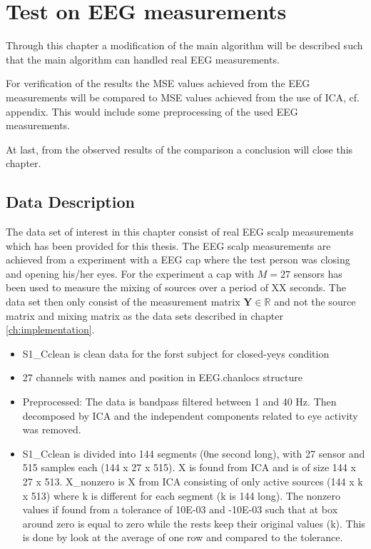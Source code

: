 \chapter{Test on EEG measurements}\label{ch:eeg_test}
Through this chapter a modification of the main algorithm will be described such that the main algorithm can handled real EEG measurements. 

For verification of the results the MSE values achieved from the EEG measurements will be compared to MSE values achieved from the use of ICA, cf. appendix. This would include some preprocessing of the used EEG measurements.

At last, from the observed results of the comparison a conclusion will close this chapter.

\section{Data Description}
The data set of interest in this chapter consist of real EEG scalp measurements which has been provided for this thesis. The EEG scalp measurements are achieved from a experiment with a EEG cap where the test person was closing and opening his/her eyes. For the experiment a cap with $M = 27$ sensors has been used to measure the mixing of sources over a period of XX seconds. The data set then only consist of the measurement matrix $\mathbf{Y} \in \mathbb{R}$ and not the source matrix and mixing matrix as the data sets described in chapter \ref{ch:implementation}.



\begin{itemize}
\item S1\_Cclean is clean data for the forst subject for closed-yeys condition
\item 27 channels with names and position in EEG.chanlocs structure 
\item Preprocessed: The data is bandpass filtered between 1 and 40 Hz. Then decomposed by ICA and the independent components related to eye activity was removed.
\item S1\_Cclean is divided into 144 segments (0ne second long), with 27 sensor and 515 samples each (144 x 27 x 515).  X is found from ICA and is of size 144 x 27 x 513. X\_nonzero is X from ICA consisting of only active sources (144 x k x 513) where k is different for each segment (k is 144 long). The nonzero values if found from a tolerance of 10E-03 and -10E-03 such that at box around zero is equal to zero while the rests keep their original values (k). This is done by look at the average of one row and compared to the tolerance.
\end{itemize}
